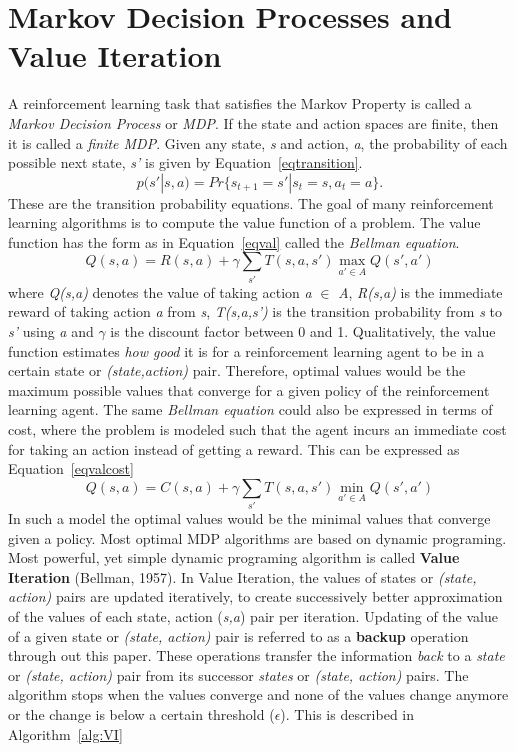 \documentclass[conference]{IEEEtran}
\begin{document}
\section{Markov Decision Processes and Value Iteration} 
\label{sec:MCP}
A reinforcement learning task that satisfies the Markov Property is called a \textit{Markov Decision Process} or \textit{MDP}. If the state and action spaces are finite, then it is called a \textit{finite MDP}. Given any state, \textit{s} and action, \textit{a}, the probability of each possible next state, \textit{s'} is given by Equation~\ref{eqtransition}.
\begin{equation}
p(s'|s,a) = Pr\{s_{t+1} = s' | s_{t} = s, a_{t} = a\}. \label{eqtransition}
\end{equation}
These are the transition probability equations. 
The goal of many reinforcement learning algorithms is to compute the value function of a problem. The value function has the form as in Equation~\ref{eqval} called the \textit{Bellman equation}.
\begin{equation}
Q(s,a)=R(s,a) + \gamma \sum\limits_{s'} T(s,a,s')  {\displaystyle\max_{a'\in A} }  Q(s',a') \label{eqval}
\end{equation}
where \textit{Q(s,a)} denotes the value of taking action \textit{a} $\in$ \textit{A}, \textit{R(s,a)} is the immediate reward of taking action \textit{a} from \textit{s}, \textit{T(s,a,s')} is the transition probability from 
\textit{s} to \textit{s'} using \textit{a} and $\gamma$ is the discount factor between 0 and 1. Qualitatively, the value function estimates \textit{how good} it is for a reinforcement learning agent to be in a certain state or \textit{(state,action)} pair. Therefore, optimal values would be the maximum possible values that converge for a given policy of the reinforcement learning agent. The same \textit{Bellman equation} could also be expressed in terms of cost, where the problem is modeled such that the agent incurs an immediate cost for taking an action instead of getting a reward. This can be expressed as Equation~\ref{eqvalcost}
\begin{equation}
Q(s,a)=C(s,a) + \gamma \sum\limits_{s'} T(s,a,s')  {\displaystyle\min_{a'\in A} }  Q(s',a') \label{eqvalcost}
\end{equation}
In such a model the optimal values would be the minimal values that converge given a policy.
Most optimal MDP algorithms are based on dynamic programing. Most powerful, yet simple dynamic programing algorithm is called \textbf{Value Iteration} (Bellman, 1957). In Value Iteration, the values of states or \textit{(state, action)} pairs are updated iteratively, to create successively better approximation of the values of each state, action (\textit{s,a}) pair per iteration. Updating of the value of a given state or \textit{(state, action)} pair is referred to as a \textbf{backup} operation through out this paper. These operations transfer the information \textit{back} to a \textit{state} or \textit{(state, action)} pair from its successor \textit{states} or \textit{(state, action)} pairs. The algorithm stops when the values converge and none of the values change anymore or the change is below a certain threshold ($\epsilon$). This is described in Algorithm~\ref{alg:VI}
\end{document}
